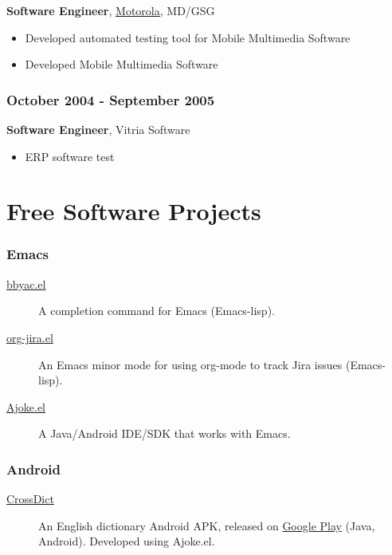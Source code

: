 \documentclass[11pt,dvipdfmx,CJKbookmarks]{article}
\begin{document}
\begin{CJK*}{UTF8}{simsun}
\textbf{Software Engineer}, \href{http://motorola.com}{Motorola},  MD/GSG

\begin{itemize}
\item Developed automated testing tool for Mobile Multimedia Software

\item Developed Mobile Multimedia Software
\end{itemize}

\subsubsection{October 2004 - September 2005}
\label{sec-1-0-7}
\textbf{Software Engineer}, Vitria Software

\begin{itemize}
\item ERP software test
\end{itemize}

\section{Free Software Projects}
\label{sec-2}

\subsubsection{Emacs}
\label{sec-2-0-1}
\begin{description}
\item[{\href{http://github.com/baohaojun/bbyac}{bbyac.el}}] A completion command for Emacs (Emacs-lisp).

\item[{\href{https://github.com/baohaojun/org-jira}{org-jira.el}}] An Emacs minor mode for using org-mode to track
Jira issues (Emacs-lisp).

\item[{\href{https://github.com/baohaojun/ajoke}{Ajoke.el}}] A Java/Android IDE/SDK that works with Emacs.
\end{description}

\subsubsection{Android}
\label{sec-2-0-2}

\begin{description}
\item[{\href{https://github.com/baohaojun/BTAndroidWebViewSelection}{CrossDict}}] An English dictionary Android APK, released on \href{https://play.google.com/store/apps/details?id=com.baohaojun.crossdict}{Google
Play} (Java, Android). Developed using Ajoke.el.
\end{description}

\end{CJK*}
\end{document}
